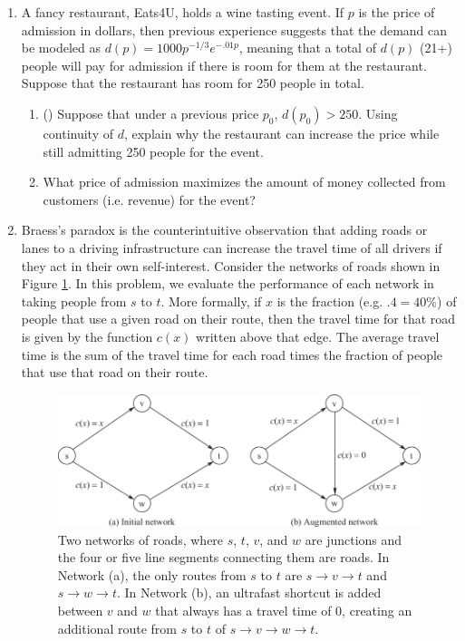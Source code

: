 \documentclass{article}
\begin{document}
\begin{enumerate}
    \addtocounter{enumi}{4}
    
    \item A fancy restaurant, {\sc Eats4U}, holds a wine tasting event. If $p$ is the price of admission in dollars, then previous experience suggests that the demand can be modeled as $d(p) = 1000p^{-1/3}e^{-.01p}$, meaning that a total of $d(p)$ (21+) people will pay for admission if there is room for them at the restaurant. Suppose that the restaurant has room for 250 people in total. 

    \begin{enumerate}
        \item (\textasteriskcentered{}) Suppose that under a previous price $p_0$, $d(p_0) > 250$. Using continuity of $d$, explain why the restaurant can increase the price while still admitting 250 people for the event.

        \vfill

        \item What price of admission maximizes the amount of money collected from customers (i.e. revenue) for the event?

        \vfill
    \end{enumerate}

    \newpage

    \item Braess's paradox is the counterintuitive observation that adding roads or lanes to a driving infrastructure can increase the travel time of all drivers if they act in their own self-interest. Consider the networks of roads shown in Figure \ref{braesss_paradox}. In this problem, we evaluate the performance of each network in taking people from $s$ to $t$. More formally, if $x$ is the fraction (e.g. $.4 = 40\%$) of people that use a given road on their route, then the travel time for that road is given by the function $c(x)$ written above that edge. The average travel time is the sum of the travel time for each road times the fraction of people that use that road on their route.

    \begin{figure}[h]
        \centering
        \includegraphics[scale=.95]{braesss_paradox.png}
        \caption{Two networks of roads, where $s$, $t$, $v$, and $w$ are junctions and the four or five line segments connecting them are roads. In Network (a), the only routes from $s$ to $t$ are $s \to v \to t$ and $s \to w \to t$. In Network (b), an ultrafast shortcut is added between $v$ and $w$ that always has a travel time of 0, creating an additional route from $s$ to $t$ of $s \to v \to w \to t$.}
        \label{braesss_paradox}
    \end{figure}


\end{enumerate}
\end{document}
